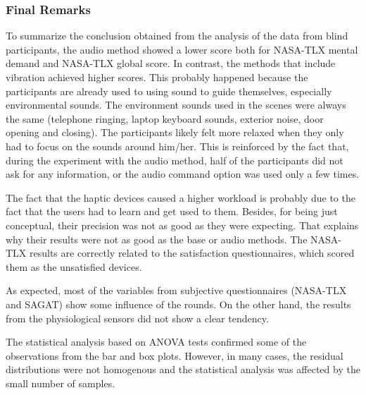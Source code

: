 




\subsubsection{Final Remarks}

To summarize the conclusion obtained from the analysis of the data from blind participants, the audio method showed a lower score both for NASA-TLX mental demand and NASA-TLX global score. In contrast, the methods that include vibration achieved higher scores. This probably happened because the participants are already used to using sound to guide themselves, especially environmental sounds. The environment sounds used in the scenes were always the same (telephone ringing, laptop keyboard sounds, exterior noise, door opening and closing). The participants likely felt more relaxed when they only had to focus on the sounds around him/her. This is reinforced by the fact that, during the experiment with the audio method, half of the participants did not ask for any information, or the audio command option was used only a few times.

The fact that the haptic devices caused a higher workload is probably due to the fact that the users had to learn and get used to them. Besides, for being just conceptual, their precision was not as good as they were expecting. That explains why their results were not as good as the base or audio methods. The NASA-TLX results are correctly related to the satisfaction questionnaires, which scored them as the unsatisfied devices.

As expected, most of the variables from subjective questionnaires (NASA-TLX and SAGAT) show some influence of the rounds. On the other hand, the results from the physiological sensors did not show a clear tendency. 

The statistical analysis based on ANOVA tests confirmed some of the observations from the bar and box plots. However, in many cases, the residual distributions were not homogenous and the statistical analysis was affected by the small number of samples. 

